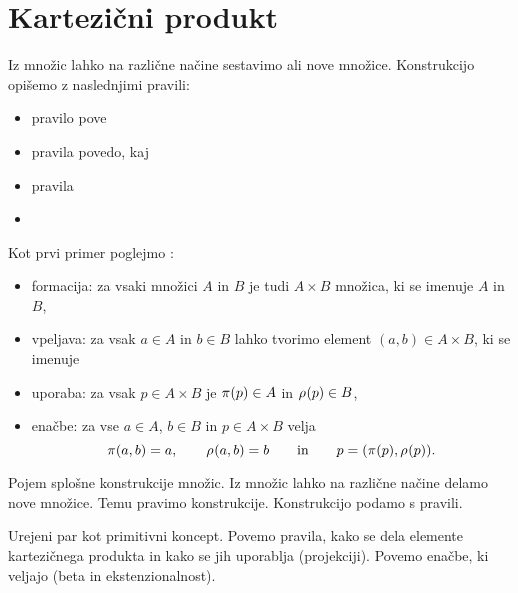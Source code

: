 

\section{Kartezični produkt}
\label{sec:kartezicni-produkt}

Iz množic lahko na različne načine sestavimo ali  nove množice.
Konstrukcijo opišemo z naslednjimi pravili:
%
\begin{itemize}
\item pravilo  pove
\item pravila  povedo, kaj 
\item pravila 
\item {}
\end{itemize}
%
Kot prvi primer poglejmo :
%
\begin{itemize}
\item formacija: za vsaki množici $A$ in $B$ je tudi $A \times B$ množica, ki se imenuje  $A$ in $B$,
\item vpeljava: za vsak $a \in A$ in $b \in B$ lahko tvorimo element $(a, b) \in A \times B$, ki se imenuje 
\item uporaba: za vsak $p \in A \times B$ je $\fst(p) \in A$ in $\snd(p) \in B$,
\item enačbe: za vse $a \in A$, $b \in B$ in $p \in A \times B$ velja
  \begin{equation*}
    \fst{(a,b)} = a,
    \qquad
    \snd{(a,b)} = b
    \qquad\text{in}\qquad
    p = (\fst(p), \snd(p)).
  \end{equation*}
\end{itemize}



Pojem splošne konstrukcije množic. Iz množic lahko na različne načine delamo nove množice.
Temu pravimo konstrukcije. Konstrukcijo podamo s pravili.

Urejeni par kot primitivni koncept. Povemo pravila, kako se dela elemente kartezičnega
produkta in kako se jih uporablja (projekciji). Povemo enačbe, ki veljajo (beta in
ekstenzionalnost).

